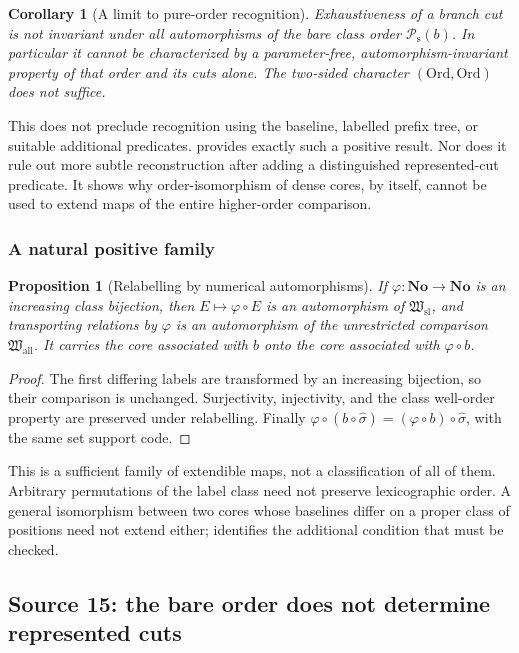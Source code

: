 \documentclass[11pt]{article}
\newtheorem{proposition}[proposition]{Proposition}
\newtheorem{corollary}[corollary]{Corollary}
\theoremstyle{definition}
\theoremstyle{remark}
\newcommand{\No}{\mathbf{No}}
\newcommand{\Ord}{\mathrm{Ord}}
\newcommand{\Hsl}{\mathfrak W_{\mathrm{sl}}}
\newcommand{\Hall}{\mathfrak W_{\mathrm{all}}}
\newcommand{\Psupp}{\mathcal P_{\mathrm{s}}}
\begin{document}
\begin{corollary}[A limit to pure-order recognition]\label{swo:gs:n10.4}
Exhaustiveness of a branch cut is not invariant under all automorphisms
of the bare class order $\Psupp(b)$. In particular it cannot be characterized
by a parameter-free, automorphism-invariant property of that order and
its cuts alone. The two-sided character $(\Ord,\Ord)$ does not suffice.
\end{corollary}

This does not preclude recognition using the baseline, labelled prefix
tree, or suitable additional predicates. 
provides exactly such a positive result. Nor does it rule out more subtle
reconstruction after adding a distinguished represented-cut predicate.
It shows why order-isomorphism of dense cores, by itself, cannot be used
to extend maps of the entire higher-order comparison.

\subsubsection{A natural positive family}
\begin{proposition}[Relabelling by numerical automorphisms]
\label{swo:gs:prop:relabelling}
If $\varphi:\No\to\No$ is an increasing class bijection, then
$E\mapsto\varphi\circ E$ is an automorphism of $\Hsl$, and transporting
relations by $\varphi$ is an automorphism of the unrestricted comparison
$\Hall$. It carries the core associated with $b$ onto the core associated
with $\varphi\circ b$.
\end{proposition}
\begin{proof}
The first differing labels are transformed by an increasing bijection,
so their comparison is unchanged. Surjectivity, injectivity, and the
class well-order property are preserved under relabelling. Finally
$\varphi\circ(b\circ\widehat\sigma)
=(\varphi\circ b)\circ\widehat\sigma$, with the same set support code.
\end{proof}

This is a sufficient family of extendible maps, not a classification of
all of them. Arbitrary permutations of the label class need not preserve
lexicographic order. A general isomorphism between two cores whose
baselines differ on a proper class of positions need not extend either;
 identifies the additional condition
that must be checked.

\subsection{Source 15: the bare order does not determine represented cuts}
\end{document}
